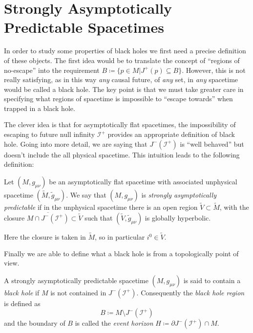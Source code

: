 \section{Strongly Asymptotically Predictable Spacetimes}
In order to study some properties of black holes we first need a precise definition of these objects. The first idea would be to translate the concept of ``regions of no-escape'' into the requirement \(B \coloneqq \{p \in M\vert J^+(p)\subseteq B \}\).
However, this is not really satisfying, as in this way \emph{any} causal future, of \emph{any} set, in \emph{any} spacetime would be called a black hole. The key point is that we must take greater care in specifying what regions of spacetime is impossible to ``escape towards'' when trapped in a black hole.

The clever idea is that for asymptotically flat spacetimes, the impossibility of escaping to future null infinity \(\mathscr{I}^+\) provides an appropriate definition of black hole. Going into more detail, we are saying that \(J^-(\mathscr{I}^+)\) is ``well behaved'' but doesn't include the all physical spacetime. This intuition leads to the following definition:
\begin{definition}
	Let \((M, g_{\mu\nu})\) be an asymptotically flat spacetime with associated unphysical spacetime \((\tilde{M}, \tilde{g}_{\mu\nu})\). We say that \((M, g_{\mu\nu})\)  is \emph{strongly asymptotically predictable} if in the unphysical spacetime there is an open region \(\tilde{V} \subset \tilde{M}\), with the closure \(\overline{M \cap J^-(\mathscr{I}^+)}\subset \tilde{V}\) such that \((\tilde{V}, \tilde{g}_{\mu\nu})\) is globally hyperbolic.
\end{definition}
\begin{remark}
	Here the closure is taken in \(\tilde{M}\), so in particular \(i^0 \in \tilde{V}\). 
\end{remark}
\noindent
Finally we are able to define what a black hole is from a topologically point of view.
\begin{definition}
	A strongly asymptotically predictable spacetime \((M, g_{\mu\nu})\) is said to contain a \emph{black hole} if \(M\) is not contained in \(J^-(\mathscr{I}^+)\). Consequently the \emph{black hole region} is defined as 
	\[
	B \coloneqq M \setminus J^-(\mathscr{I}^+)
	\]
	and the boundary of \(B\) is called the \emph{event horizon} \(H\coloneqq \partial J^-(\mathscr{I}^+) \cap M \).
\end{definition}

